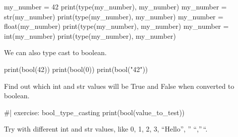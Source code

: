 \documentclass[
  letterpaper,
  DIV=11,
  numbers=noendperiod]{scrreprt}
\newenvironment{Shaded}{\begin{snugshade}}{\end{snugshade}}
\newcommand{\NormalTok}[1]{\textcolor[rgb]{0.00,0.23,0.31}{#1}}
\theoremstyle{remark}
\begin{document}
\begin{Shaded}
\begin{Highlighting}[]
\NormalTok{my\_number = 42}
\NormalTok{print(type(my\_number), my\_number)}
\NormalTok{my\_number = str(my\_number)}
\NormalTok{print(type(my\_number), my\_number)}
\NormalTok{my\_number = float(my\_number)}
\NormalTok{print(type(my\_number), my\_number)}
\NormalTok{my\_number = int(my\_number)}
\NormalTok{print(type(my\_number), my\_number)}
\end{Highlighting}
\end{Shaded}

We can also type cast to boolean.

\begin{Shaded}
\begin{Highlighting}[]
\NormalTok{print(bool(42))}
\NormalTok{print(bool(0))}
\NormalTok{print(bool("42"))}
\end{Highlighting}
\end{Shaded}

Find out which int and str values will be True and False when converted
to boolean.

\begin{Shaded}
\begin{Highlighting}[]
\NormalTok{\#| exercise: bool\_type\_casting}
\NormalTok{print(bool(value\_to\_test))}
\end{Highlighting}
\end{Shaded}

\begin{tcolorbox}[enhanced jigsaw, opacityback=0, colframe=quarto-callout-note-color-frame, breakable, colback=white, colbacktitle=quarto-callout-note-color!10!white, titlerule=0mm, left=2mm, toprule=.15mm, coltitle=black, opacitybacktitle=0.6, bottomrule=.15mm, arc=.35mm, leftrule=.75mm, bottomtitle=1mm, toptitle=1mm, rightrule=.15mm, title=\textcolor{quarto-callout-note-color}{\faInfo}\hspace{0.5em}{Note}]

Try with different int and str values, like 0, 1, 2, 3, ``Hello'', ''
``,''\,``.

\end{tcolorbox}
\end{document}
